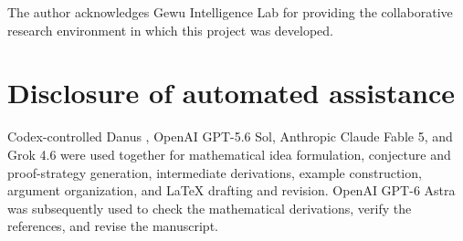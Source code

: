 \documentclass[11pt]{amsart}
\theoremstyle{remark}
\begin{document}
The author acknowledges Gewu Intelligence Lab for providing the collaborative
research environment in which this project was developed.

\section*{Disclosure of automated assistance}

Codex-controlled Danus \cite{Danus}, OpenAI GPT-5.6 Sol,
Anthropic Claude Fable 5, and Grok 4.6 were used together for mathematical idea formulation,
conjecture and proof-strategy generation, intermediate derivations, example
construction, argument organization, and LaTeX drafting and revision.
OpenAI GPT-6 Astra was subsequently used to check the mathematical
derivations, verify the references, and revise the manuscript.
\end{document}
